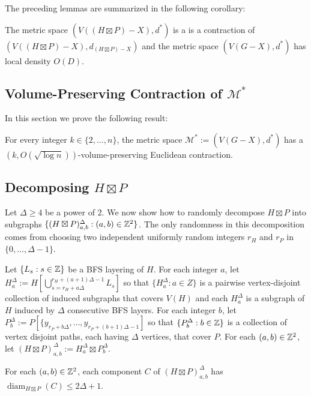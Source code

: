 \documentclass{patmorin}
\renewcommand{\ge}{\geqslant}
\renewcommand{\le}{\leqslant}
\DeclareMathOperator{\diam}{diam}
\begin{document}
The preceding lemmas are summarized in the following corollary:

\begin{cor}\label{d_star_summary}
  The metric space $(V((H\boxtimes P)-X), d^*)$ is a is a contraction of $(V((H\boxtimes P)-X), d_{(H\boxtimes P)-X})$ and the metric space $(V(G-X),d^*)$ has local density $O(D)$.
\end{cor}



\subsection{Volume-Preserving Contraction of $\mathcal{M}^*$}

In this section we prove the following result:

\begin{lem}\label{dstar_contraction}
  For every integer $k\in\{2,\ldots,n\}$, the metric space $\mathcal{M}^*:=(V(G-X),d^*)$ has a $(k,O(\sqrt{\log n}))$-volume-preserving Euclidean contraction.
\end{lem}

\subsection{Decomposing $H\boxtimes P$}

Let $\Delta\ge 4$ be a power of $2$. We now show how to randomly decompose $H\boxtimes P$ into subgraphs $\{(H\boxtimes P)^\Delta_{a,b}:(a,b)\in\mathbb{Z}^2\}$.  The only randomness in this decomposition comes from choosing two independent uniformly random integers $r_H$ and $r_P$ in $\{0,\ldots,\Delta-1\}$.

Let $\{L_s:s\in\mathbb{Z}\}$ be a BFS layering of $H$.  For each integer $a$, let $H^\Delta_a:=H[\bigcup_{s=r_H+a\Delta}^{r_H+(a+1)\Delta-1} L_s]$ so that $\{H^\Delta_a:a\in Z\}$ is a pairwise vertex-disjoint collection of induced subgraphs that covers $V(H)$ and each $H^\Delta_a$ is a subgraph of $H$ induced by $\Delta$ consecutive BFS layers. For each integer $b$, let $P^\Delta_b:=P[\{y_{r_P+b\Delta},\ldots,y_{r_P+(b+1)\Delta-1}]$ so that $\{P^\Delta_b:b\in\mathbb{Z}\}$ is a collection of vertex disjoint paths, each having $\Delta$ vertices, that cover $P$.   For each $(a,b)\in\mathbb{Z}^2$, let $(H\boxtimes P)^\Delta_{a,b}:= H^\Delta_a \boxtimes P^\Delta_b$.

\begin{lem}\label{component_diameter}
  For each $(a,b)\in\mathbb{Z}^2$, each component $C$ of $(H\boxtimes P)^\Delta_{a,b}$ has $\diam_{H\boxtimes P}(C)\le 2\Delta+1$.
\end{lem}
\end{document}
